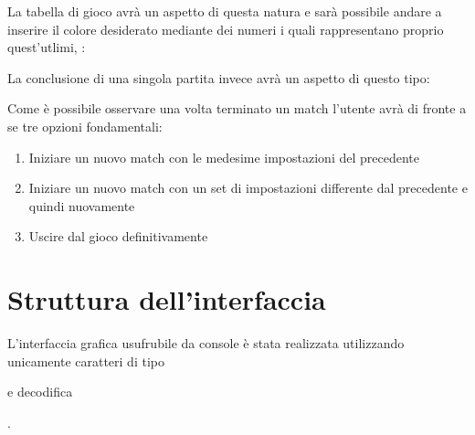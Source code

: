 \documentclass[letterpaper,10pt,italian,openany,oneside]{sphinxmanual}
\begin{document}

\noindent{}

La tabella di gioco avrà un aspetto di questa natura e sarà possibile andare a inserire il colore desiderato mediante dei numeri i quali rappresentano proprio quest’utlimi, :

\noindent{}

La conclusione di una singola partita invece avrà un aspetto di questo tipo:

\noindent{}

Come è possibile osservare una volta terminato un match l’utente avrà di fronte a se tre opzioni fondamentali:
\begin{enumerate}
\def\theenumi{\arabic{enumi}}
\def\labelenumi{\theenumi )}
\makeatletter\def\p@enumii{\p@enumi \theenumi )}\makeatother
\item {} 
Iniziare un nuovo match con le medesime impostazioni del precedente

\item {} 
Iniziare un nuovo match con un set di impostazioni differente dal precedente e quindi  nuovamente

\item {} 
Uscire dal gioco definitivamente

\end{enumerate}


\section{Struttura dell’interfaccia}
\label{\detokenize{gameguide:struttura-dell-interfaccia}}
L’interfaccia grafica usufrubile da console è stata realizzata utilizzando unicamente caratteri di tipo  %
\begin{footnote}[3]\sphinxAtStartFootnote
{}
%
\end{footnote} e decodifica  %
\begin{footnote}[4]\sphinxAtStartFootnote
{}
%
\end{footnote}.
\end{document}

